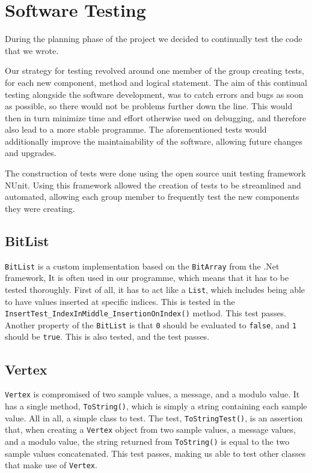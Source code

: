 \section{Software Testing}
During the planning phase of the project we decided to continually test the code that we wrote.

Our strategy for testing revolved around one member of the group creating tests, for each new component, method and logical statement.
The aim of this continual testing alongside the software development, was to catch errors and bugs as soon as possible, so there would not be problems further down the line.
This would then in turn minimize time and effort otherwise used on debugging, and therefore also lead to a more stable programme.
The aforementioned tests would additionally improve the maintainability of the software, allowing future changes and upgrades.

The construction of tests were done using the open source unit testing framework NUnit.
Using this framework allowed the creation of tests to be streamlined and automated, allowing each group member to frequently test the new components they were creating.

\subsection*{BitList}
\lstinline|BitList| is a custom implementation based on the \lstinline|BitArray| from the .Net framework, 
It is often used in our programme, which means that it has to be tested thoroughly.
First of all, it has to act like a \lstinline|List|, which includes being able to have values inserted at specific indices.
This is tested in the \lstinline|InsertTest_IndexInMiddle_InsertionOnIndex()| method.
This test passes.\\
Another property of the \lstinline|BitList| is that \lstinline|0| should be evaluated to \lstinline|false|, and \lstinline|1| should be \lstinline|true|.
This is also tested, and the test passes.

\subsection*{Vertex}
\lstinline|Vertex| is compromised of two sample values, a message, and a modulo value.
It has a single method, \lstinline|ToString()|, which is simply a string containing each sample value.
All in all, a simple class to test.
The test, \lstinline|ToStringTest()|, is an assertion that, when creating a \lstinline|Vertex| object from two sample values, a message values, and a modulo value, the string returned from \lstinline|ToString()| is equal to the two sample values concatenated.
This test passes, making us able to test other classes that make use of \lstinline|Vertex|.

